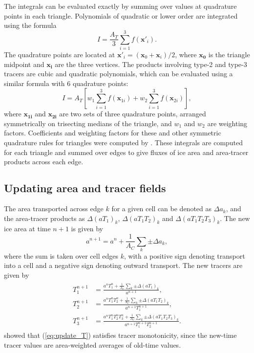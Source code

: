The integrals can be evaluated exactly by summing over values at quadrature points in each triangle. Polynomials of quadratic or lower order are integrated using the formula
\begin{equation}
\label{eq:quadrature1}
I = \frac{{{A}_{T}}}{3}\sum\limits_{i=1}^{3}{f({{{\mathbf{{x}'}}}_{i}})}.
\end{equation}
The quadrature points are located at ${{\mathbf{{x}'}}_{i}}=({{\mathbf{x}}_{0}}+{{\mathbf{x}}_{i}})/2$, where $\mathbf{x_0}$ is the triangle midpoint and $\mathbf{x_i}$ are the three vertices. The products involving type-2 and type-3 tracers are cubic and quadratic polynomials, which can be evaluated using a similar formula with 6 quadrature points:
\begin{equation}
\label{eq:quadrature2}
I = {{A}_{T}}\left[ {{w}_{1}}\sum\limits_{i=1}^{3}{f({{\mathbf{x}}_{1i}})}+{{w}_{2}}\sum\limits_{i=1}^{3}{f({{\mathbf{x}}_{2i}})} \right],
\end{equation}
where $\mathbf{x_{1i}}$ and $\mathbf{x_{2i}}$ are two sets of three quadrature points, arranged symmetrically on trisecting medians of the triangle, and $w_1$ and $w_2$ are weighting factors. Coefficients and weighting factors for these and other symmetric quadrature rules for triangles were computed by \citet{Dunavant85}. These integrals are computed for each triangle and summed over edges to give fluxes of ice area and area-tracer products across each edge.

\subsection{Updating area and tracer fields}
\label{IR_update}

The area transported across edge $k$ for a given cell can be denoted as $\Delta a_k$,  and the area-tracer products as $\Delta (a T_1)_k$, $\Delta (a T_1 T_2)_k$ and $\Delta (a T_1 T_2 T_3)_k$. The new ice area at time $n+1$ is given by
\begin{equation}
\label{eq:update_a}
{{a}^{n+1}} = {{a}^{n}}+\frac{1}{{{A}_{C}}}\sum\limits_{k}{\pm \Delta {{a}_{k}}},
\end{equation}
where the sum is taken over cell edges $k$, with a positive sign denoting transport into a cell and a negative sign denoting outward transport. The new tracers are given by
\begin{align}
\begin{split}
\label{eq:update_T}
   T_{1}^{n+1} & = \frac{{{a}^{n}}T_{1}^{n}+\frac{1}{{{A}_{C}}}\sum\limits_{k}{\pm \Delta {{(a{{T}_{1}})}_{k}}}}{{{a}^{n+1}}},  \\
   T_{2}^{n+1} & = \frac{{{a}^{n}}T_{1}^{n}T_{2}^{n}+\frac{1}{{{A}_{C}}}\sum\limits_{k}{\pm \Delta {{(a{{T}_{1}}{{T}_{2}})}_{k}}}}{{{a}^{n+1}}T_{1}^{n+1}},  \\
   T_{3}^{n+1} & =\frac{{{a}^{n}}T_{1}^{n}T_{2}^{n}T_{3}^{n}+\frac{1}{{{A}_{C}}}\sum\limits_{k}{\pm \Delta {{(a{{T}_{1}}{{T}_{2}}{{T}_{3}})}_{k}}}}{{{a}^{n+1}}T_{1}^{n+1}T_{2}^{n+1}}.
\end{split}
\end{align}
\citet{Dukowicz00} showed that (\ref{eq:update_T}) satisfies tracer
monotonicity, since the new-time tracer values are area-weighted
averages of old-time values.

